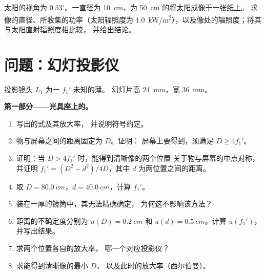 \begin{exercise}[$\star\star\star$]\label{exo:b1:mirrors-thin-lenses:12}
太阳的视角为 $0.53^\circ$。一直径为
\qty{10}{cm}、为 \qty{50}{cm} 的将太阳成像于一张纸上。
求像的直径、所收集的功率（太阳辐照度为
\qty{1.0}{kW/m^2}），以及像处的辐照度；将其与太阳直射辐照度相比较，
并给出结论。
\end{exercise}

\section{问题：幻灯投影仪}

\begin{problem}
\label{pb:b1:mirrors-thin-lenses:1}
投影镜头 $L_1$ 为一 $f_1'$ 未知的薄。
幻灯片高 \qty{24}{mm}，宽 \qty{36}{mm}。

\medskip
\noindent\textbf{第一部分——光具座上的。}
\begin{enumerate}
  \item 写出的式及其放大率，
        并说明符号约定。
  \item 物与屏幕之间的距离固定为 $D$。证明：
        屏幕上要得到，须满足 $D \geq 4f_1'$。
  \item 证明：当 $D > 4f_1'$ 时，能得到清晰像的两个位置
        关于物与屏幕的中点对称，
        并证明 $f_1' = (D^2 - d^2)/4D$，其中 $d$
        为两位置之间的距离。
  \item 取 $D = \qty{80.0}{cm}$，$d = \qty{40.0}{cm}$，计算
        $f_1'$。
  \item {}装在一厚的镜筒中，其无法精确确定，
        为何这不影响该方法？
  \item 距离的不确定度分别为 $u(D) = \qty{0.2}{cm}$ 和
        $u(d) = \qty{0.5}{cm}$。计算 $u(f_1')$，并写出结果。
  \item 求两个位置各自的放大率，
        哪一个对应投影仪？
  \item 求能得到清晰像的最小 $D$，
        以及此时的放大率（西尔伯曼）。
\end{enumerate}


\end{problem}
